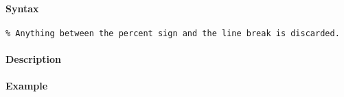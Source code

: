 


	\paragraph{Syntax}\label{syntax}

\begin{verbatim}
% Anything between the percent sign and the line break is discarded.
\end{verbatim}

\paragraph{Description}\label{description}

\paragraph{Example}\label{example}


